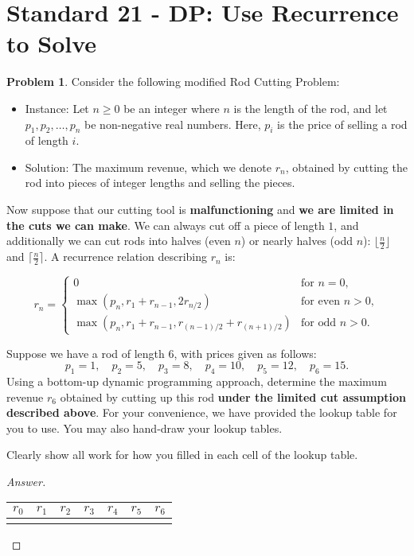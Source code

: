 \documentclass[11pt]{article}
\theoremstyle{definition}
\theoremstyle{definition}
\newtheorem{required}{Problem}
\theoremstyle{definition}
\begin{document}
\newpage
\section{Standard 21 - DP: Use Recurrence to Solve}

\begin{required} \label{Problem2}
Consider the following modified \textsf{Rod Cutting Problem}:  
\begin{itemize}
\item \textsf{Instance:} Let $n \geq 0$ be an integer where $n$ is the length of the rod, and let $p_{1}, p_{2}, \ldots, p_{n}$ be non-negative real numbers. Here, $p_{i}$ is the price of selling a rod of length $i$.
\item \textsf{Solution:} The maximum revenue, which we denote $r_{n}$, obtained by cutting the rod into pieces of integer lengths and selling the pieces.
\end{itemize}

\noindent Now suppose that our cutting tool is \textbf{malfunctioning} and \textbf{we are limited in the cuts we can make}.  We can always cut off a piece of length $1$, and additionally we can cut rods into halves (even $n$) or nearly halves (odd $n$): $\lfloor\frac{n}{2}\rfloor$ and $\lceil\frac{n}{2}\rceil$.  A recurrence relation describing $r_n$ is:

\[
r_{n} =
\begin{cases} 
	0 & \text{for } n=0,\\
	\max(p_n, r_1 + r_{n-1}, 2r_{n/2}) & \text{for even } n > 0, \\
        \max(p_n, r_1 + r_{n-1}, r_{(n-1)/2} + r_{(n+1)/2}) & \text{for odd } n > 0.
\end{cases}
\]

Suppose we have a rod of length $6$, with prices given as follows:
\[ p_{1} = 1, \quad p_{2} = 5, \quad p_{3} = 8, \quad p_{4} = 10, \quad p_{5} = 12, \quad p_{6} = 15. \] 
Using a bottom-up dynamic programming approach, determine the maximum revenue $r_{6}$ obtained by cutting up this rod \textbf{under the limited cut assumption described above}. For your convenience, we have provided the lookup table for you to use. You may also hand-draw your lookup tables. 

\noindent Clearly show all work for how you filled in each cell of the lookup table.

\end{required}

\begin{proof}[Answer]
\begin{center}
	\begin{tabular}{|c|c|c|c|c|c|c|}
	\hline
	$r_0$ & $r_{1}$ & $r_{2}$ & $r_{3}$ & $r_{4}$ & $r_{5}$ & $r_{6}$ \\ \hline
        & & & & & & \\ \hline
	\end{tabular}
\end{center}
\end{proof}

\end{document}
